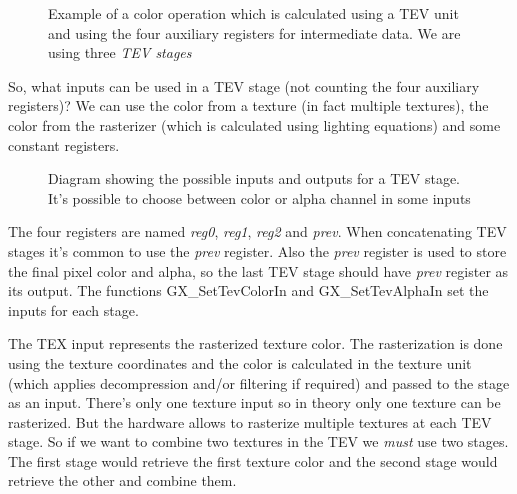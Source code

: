 \documentclass[12pt]{article}
\newcommand{\fname}[1] {{\color{blue}#1}}
\begin{document}
\begin{figure}[ht]
\centering
{}
\caption{Example of a color operation which is calculated using a TEV unit and using the four auxiliary registers for intermediate data. We are using three \emph{TEV stages}}
\label{fig:tev_stage_sample1}
\end {figure}

So, what inputs can be used in a TEV stage (not counting the four auxiliary registers)? We can use the color from a texture (in fact multiple textures), the color from the rasterizer (which is calculated using lighting equations) and some constant registers.

\begin{figure}[ht]
\centering
{}
\hspace{1em}
\caption{Diagram showing the possible inputs and outputs for a TEV stage. It's possible to choose between color or alpha channel in some inputs}
\label{fig:tev_stage_sample2}
\end {figure}

The four registers are named \emph{reg0}, \emph{reg1}, \emph{reg2} and \emph{prev}. When concatenating TEV stages it's common to use the \emph{prev} register. Also the \emph{prev} register is used to store the final pixel color and alpha, so the last TEV stage should have \emph{prev} register as its output. The functions \fname{GX\_SetTevColorIn} and \fname{GX\_SetTevAlphaIn} set the inputs for each stage.

The TEX input represents the rasterized texture color. The rasterization is done using the texture coordinates and the color is calculated in the texture unit (which applies decompression and/or filtering if required) and passed to the stage as an input. There's only one texture input so in theory only one texture can be rasterized. But the hardware allows to rasterize multiple textures at each TEV stage. So if we want to combine two textures in the TEV we \emph{must} use two stages. The first stage would retrieve the first texture color and the second stage would retrieve the other and combine them.
\end{document}
